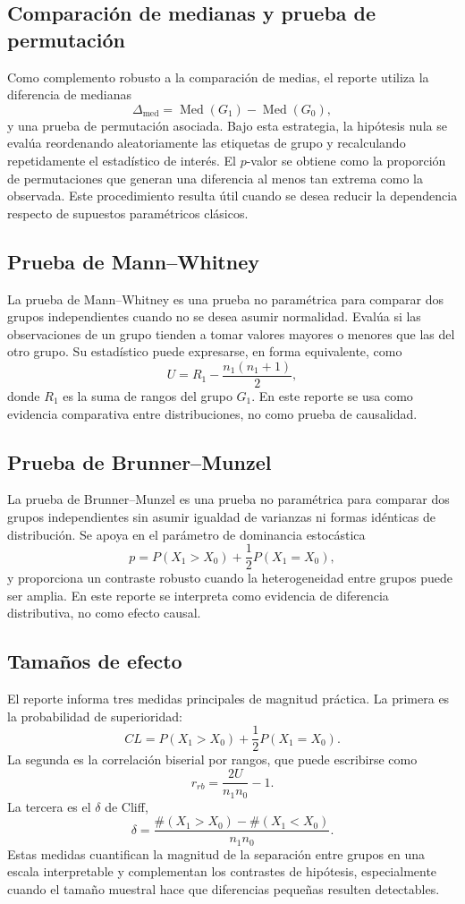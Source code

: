 \documentclass[10pt,letterpaper]{article} %
\numberwithin{figure}{subsection}
\begin{document}
\subsection{Comparación de medianas y prueba de permutación}
\label{apx:permutation}
Como complemento robusto a la comparación de medias, el reporte utiliza la diferencia de medianas
\[
\Delta_{\mathrm{med}}=\operatorname{Med}(G_1)-\operatorname{Med}(G_0),
\]
y una prueba de permutación asociada. Bajo esta estrategia, la hipótesis nula se evalúa reordenando aleatoriamente las etiquetas de grupo y recalculando repetidamente el estadístico de interés. El $p$-valor se obtiene como la proporción de permutaciones que generan una diferencia al menos tan extrema como la observada. Este procedimiento resulta útil cuando se desea reducir la dependencia respecto de supuestos paramétricos clásicos.

\subsection{Prueba de Mann--Whitney}
\label{apx:mann-whitney}
La prueba de Mann--Whitney es una prueba no paramétrica para comparar dos grupos independientes cuando no se desea asumir normalidad. Evalúa si las observaciones de un grupo tienden a tomar valores mayores o menores que las del otro grupo. Su estadístico puede expresarse, en forma equivalente, como
\[
U = R_1-\frac{n_1(n_1+1)}{2},
\]
donde $R_1$ es la suma de rangos del grupo $G_1$. En este reporte se usa como evidencia comparativa entre distribuciones, no como prueba de causalidad.

\subsection{Prueba de Brunner--Munzel}
\label{apx:brunner-munzel}
La prueba de Brunner--Munzel es una prueba no paramétrica para comparar dos grupos independientes sin asumir igualdad de varianzas ni formas idénticas de distribución. Se apoya en el parámetro de dominancia estocástica
\[
p=P(X_1>X_0)+\frac{1}{2}P(X_1=X_0),
\]
y proporciona un contraste robusto cuando la heterogeneidad entre grupos puede ser amplia. En este reporte se interpreta como evidencia de diferencia distributiva, no como efecto causal.

\subsection{Tamaños de efecto}
\label{apx:effect-size}
El reporte informa tres medidas principales de magnitud práctica. La primera es la probabilidad de superioridad:
\[
CL=P(X_1>X_0)+\frac{1}{2}P(X_1=X_0).
\]
La segunda es la correlación biserial por rangos, que puede escribirse como
\[
r_{rb}=\frac{2U}{n_1n_0}-1.
\]
La tercera es el $\delta$ de Cliff,
\[
\delta=\frac{\#(X_1>X_0)-\#(X_1<X_0)}{n_1n_0}.
\]
Estas medidas cuantifican la magnitud de la separación entre grupos en una escala interpretable y complementan los contrastes de hipótesis, especialmente cuando el tamaño muestral hace que diferencias pequeñas resulten detectables.
\end{document}
